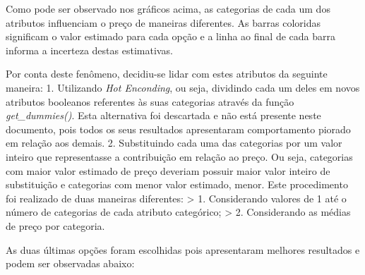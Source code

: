 \documentclass[11pt]{article}
\begin{document}
    Como pode ser observado nos gráficos acima, as categorias de cada um dos
atributos influenciam o preço de maneiras diferentes. As barras
coloridas significam o valor estimado para cada opção e a linha ao final
de cada barra informa a incerteza destas estimativas.

    Por conta deste fenômeno, decidiu-se lidar com estes atributos da
seguinte maneira: 1. Utilizando \emph{Hot Enconding}, ou seja, dividindo
cada um deles em novos atributos booleanos referentes às suas categorias
através da função \emph{get\_dummies()}. Esta alternativa foi descartada
e não está presente neste documento, pois todos os seus resultados
apresentaram comportamento piorado em relação aos demais. 2.
Substituindo cada uma das categorias por um valor inteiro que
representasse a contribuição em relação ao preço. Ou seja, categorias
com maior valor estimado de preço deveriam possuir maior valor inteiro
de substituição e categorias com menor valor estimado, menor. Este
procedimento foi realizado de duas maneiras diferentes: \textgreater{}
1. Considerando valores de 1 até o número de categorias de cada atributo
categórico; \textgreater{} 2. Considerando as médias de preço por
categoria.

As duas últimas opções foram escolhidas pois apresentaram melhores
resultados e podem ser observadas abaixo:
\end{document}
